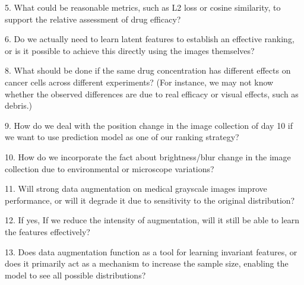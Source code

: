 5. What could be reasonable metrics, such as L2 loss or cosine similarity, to support the relative assessment of drug efficacy?

6. Do we actually need to learn latent features to establish an effective ranking, or is it possible to achieve this directly using the images themselves?

8. What should be done if the same drug concentration has different effects on cancer cells across different experiments? (For instance, 
we may not know whether the observed differences are due to real efficacy or visual effects, such as debris.)


9. How do we deal with the position change in the image collection of day 10 if we want to use prediction 
model as one of our ranking strategy?

10. How do we incorporate the fact about brightness/blur change in the image collection due to environmental or microscope 
variations?

11. Will strong data augmentation on medical grayscale images improve performance, or will it degrade it due to sensitivity to the original distribution?

12. If yes, If we reduce the intensity of augmentation, will it still be able to learn the features effectively?


13. Does data augmentation function as a tool for learning invariant features, or does it primarily act as a mechanism to increase the sample size,
 enabling the model to see all possible distributions?



